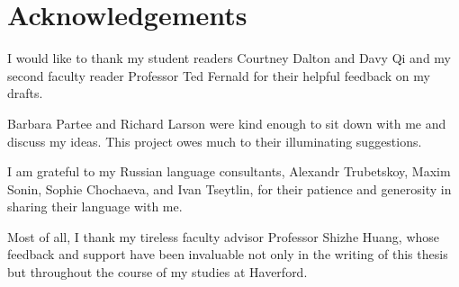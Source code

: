 \section*{Acknowledgements}
I would like to thank my student readers Courtney Dalton and Davy Qi and my second faculty reader Professor Ted Fernald for their helpful feedback on my drafts.

Barbara Partee and Richard Larson were kind enough to sit down with me and discuss my ideas. This project owes much to their illuminating suggestions.

I am grateful to my Russian language consultants, Alexandr Trubetskoy, Maxim Sonin, Sophie Chochaeva, and Ivan Tseytlin, for their patience and generosity in sharing their language with me.

Most of all, I thank my tireless faculty advisor Professor Shizhe Huang, whose feedback and support have been invaluable not only in the writing of this thesis but throughout the course of my studies at Haverford.